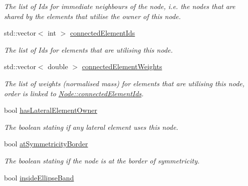 \begin{DoxyCompactItemize}
\begin{DoxyCompactList}\small\item\em The list of Id\textquotesingle{}s for immediate neighbours of the node, i.\+e. the nodes that are shared by the elements that utilise the owner of this node. \end{DoxyCompactList}\item 
\hypertarget{classNode_a42c30c38a9406e72b1fc3b1cc9448d37}{}std\+::vector$<$ int $>$ \hyperlink{classNode_a42c30c38a9406e72b1fc3b1cc9448d37}{connected\+Element\+Ids}\label{classNode_a42c30c38a9406e72b1fc3b1cc9448d37}

\begin{DoxyCompactList}\small\item\em The list of Id\textquotesingle{}s for elements that are utilising this node. \end{DoxyCompactList}\item 
\hypertarget{classNode_a8f3f1b55c7bfb8b81d8182c06ad1eee4}{}std\+::vector$<$ double $>$ \hyperlink{classNode_a8f3f1b55c7bfb8b81d8182c06ad1eee4}{connected\+Element\+Weights}\label{classNode_a8f3f1b55c7bfb8b81d8182c06ad1eee4}

\begin{DoxyCompactList}\small\item\em The list of weights (normalised mass) for elements that are utilising this node, order is linked to \hyperlink{classNode_a42c30c38a9406e72b1fc3b1cc9448d37}{Node\+::connected\+Element\+Ids}. \end{DoxyCompactList}\item 
\hypertarget{classNode_a71d38b47678cff15e338f9c917d32696}{}bool \hyperlink{classNode_a71d38b47678cff15e338f9c917d32696}{has\+Lateral\+Element\+Owner}\label{classNode_a71d38b47678cff15e338f9c917d32696}

\begin{DoxyCompactList}\small\item\em The boolean stating if any lateral element uses this node. \end{DoxyCompactList}\item 
\hypertarget{classNode_ae14618d71e657039ed84316154be7330}{}bool \hyperlink{classNode_ae14618d71e657039ed84316154be7330}{at\+Symmetricity\+Border}\label{classNode_ae14618d71e657039ed84316154be7330}

\begin{DoxyCompactList}\small\item\em The boolean stating if the node is at the border of symmetricity. \end{DoxyCompactList}\item 
\hypertarget{classNode_a216c4bf4af00dc77d8c88c4d2952f6ab}{}bool \hyperlink{classNode_a216c4bf4af00dc77d8c88c4d2952f6ab}{inside\+Ellipse\+Band}\label{classNode_a216c4bf4af00dc77d8c88c4d2952f6ab}


\end{DoxyCompactItemize}
